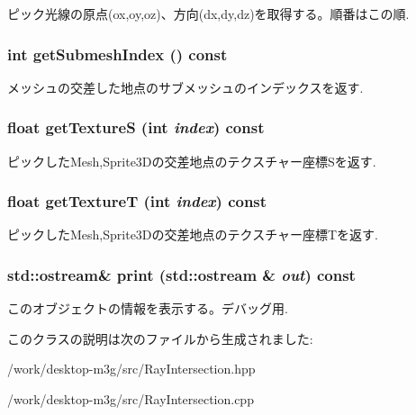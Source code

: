 ピック光線の原点(ox,oy,oz)、方向(dx,dy,dz)を取得する。順番はこの順. \hypertarget{classm3g_1_1RayIntersection_6a11c61d1a1fecc01f2f83463404a6b8}{
\subsubsection[{getSubmeshIndex}]{\setlength{\rightskip}{0pt plus 5cm}int getSubmeshIndex () const}}
\label{classm3g_1_1RayIntersection_6a11c61d1a1fecc01f2f83463404a6b8}


メッシュの交差した地点のサブメッシュのインデックスを返す. \hypertarget{classm3g_1_1RayIntersection_bc14e1d5a83d5fca608b1fbf772614d4}{
\subsubsection[{getTextureS}]{\setlength{\rightskip}{0pt plus 5cm}float getTextureS (int {\em index}) const}}
\label{classm3g_1_1RayIntersection_bc14e1d5a83d5fca608b1fbf772614d4}


ピックしたMesh,Sprite3Dの交差地点のテクスチャー座標Sを返す. \hypertarget{classm3g_1_1RayIntersection_843d5b907bb54a6f28571f0a0f14c932}{
\subsubsection[{getTextureT}]{\setlength{\rightskip}{0pt plus 5cm}float getTextureT (int {\em index}) const}}
\label{classm3g_1_1RayIntersection_843d5b907bb54a6f28571f0a0f14c932}


ピックしたMesh,Sprite3Dの交差地点のテクスチャー座標Tを返す. \hypertarget{classm3g_1_1RayIntersection_d6bd96bbcbdd53ede8e72f8f13c0da48}{
\subsubsection[{print}]{\setlength{\rightskip}{0pt plus 5cm}std::ostream\& print (std::ostream \& {\em out}) const}}
\label{classm3g_1_1RayIntersection_d6bd96bbcbdd53ede8e72f8f13c0da48}


このオブジェクトの情報を表示する。デバッグ用. 

このクラスの説明は次のファイルから生成されました:\begin{CompactItemize}
\item 
/work/desktop-m3g/src/RayIntersection.hpp\item 
/work/desktop-m3g/src/RayIntersection.cpp\end{CompactItemize}
